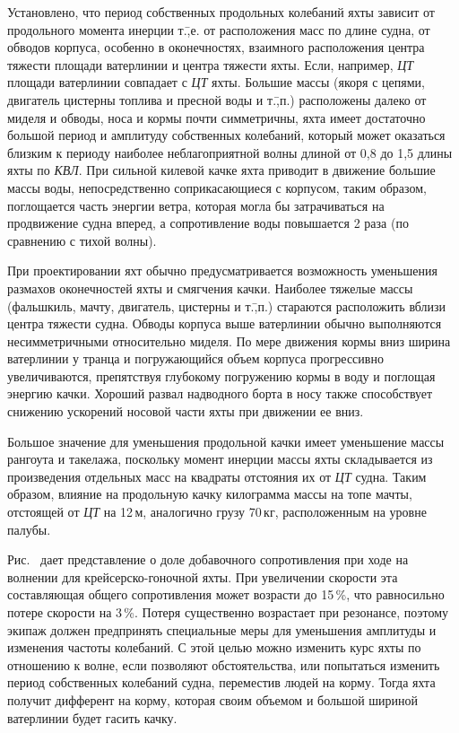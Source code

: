 Установлено, что период собственных продольных колебаний яхты зависит от продольного момента инерции т.\=,е. от расположения масс по длине судна, от обводов корпуса, особенно в оконечностях, взаимного расположения центра тяжести площади ватерлинии и центра тяжести яхты. Если, например, \textit{ЦТ} площади ватерлинии совпадает с \textit{ЦТ} яхты. Большие массы (якоря с цепями, двигатель цистерны топлива и пресной воды и т.\=,п.) расположены далеко от миделя и обводы, носа и кормы почти симметричны, яхта имеет достаточно большой период и амплитуду собственных колебаний, который может оказаться близким к периоду наиболее неблагоприятной волны длиной от 0,8 до 1,5 длины яхты по \textit{КВЛ}. При сильной килевой качке яхта приводит в движение большие массы воды, непосредственно соприкасающиеся с корпусом, таким образом, поглощается часть энергии ветра, которая могла бы затрачиваться на продвижение судна вперед, а сопротивление воды повышается 2 раза (по сравнению с тихой волны). 

При проектировании яхт обычно предусматривается возможность уменьшения размахов оконечностей яхты и смягчения качки. Наиболее тяжелые массы (фальшкиль, мачту, двигатель, цистерны и т.\=,п.) стараются расположить вблизи центра тяжести судна. Обводы корпуса выше ватерлинии обычно выполняются несимметричными относительно миделя. По мере движения кормы вниз ширина ватерлинии у транца и погружающийся объем корпуса прогрессивно увеличиваются, препятствуя глубокому погружению кормы в воду и поглощая энергию качки. Хороший развал надводного борта в носу также способствует снижению ускорений носовой части яхты при движении ее вниз.
 
Большое значение для уменьшения продольной качки имеет уменьшение массы рангоута и такелажа, поскольку момент инерции массы яхты складывается из произведения отдельных масс на квадраты отстояния их от \textit{ЦТ} судна. Таким образом, влияние на продольную качку килограмма массы на топе мачты, отстоящей от \textit{ЦТ} на 12\,м, аналогично грузу 70\,кг, расположенным на уровне палубы. 

Рис.~ дает представление о доле добавочного сопротивления при ходе на волнении для крейсерско-гоночной яхты. При увеличении скорости эта составляющая общего сопротивления может возрасти до 15\,\%, что равносильно потере скорости на 3\,\%. Потеря существенно возрастает при резонансе, поэтому экипаж должен предпринять специальные меры для уменьшения амплитуды и изменения частоты колебаний. С этой целью можно изменить курс яхты по отношению к волне, если позволяют обстоятельства, или попытаться изменить период собственных колебаний судна, переместив людей на корму. Тогда яхта получит дифферент на корму, которая своим объемом и большой шириной ватерлинии будет гасить качку. 

